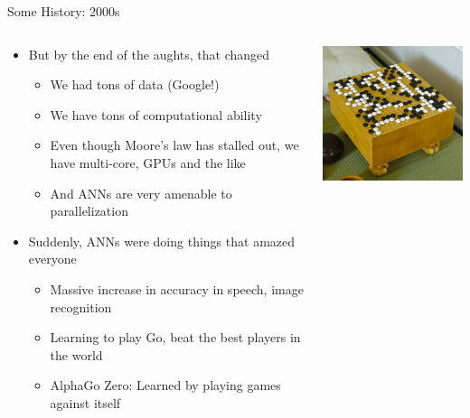 \documentclass[aspectratio=169]{beamer}
\begin{document}
\begin{frame}{Some History: 2000s}

\begin{columns}
\begin{column}{0.6\textwidth}
\begin{itemize}
	\item But by the end of the aughts, that changed %
	\begin{itemize}
		\item We had tons of data (Google!)
		\item We have tons of computational ability 
		\item Even though Moore's law has stalled out, we have multi-core, GPUs and the like 
		\item And ANNs are very amenable to parallelization
	\end{itemize}
	\item Suddenly, ANNs were doing things that amazed everyone
	\begin{itemize}
		\item Massive increase in accuracy in speech, image recognition
		\item Learning to play Go, beat the best players in the world
		\item AlphaGo Zero: Learned by playing games against itself
	\end{itemize}
	
\end{itemize}

\end{column}
\begin{column}{0.4\textwidth}
\includegraphics[width=1\textwidth]{lectFF/256px-FloorGoban.JPG}
\end{column}
\end{columns}
	\end{frame}
\end{document}
